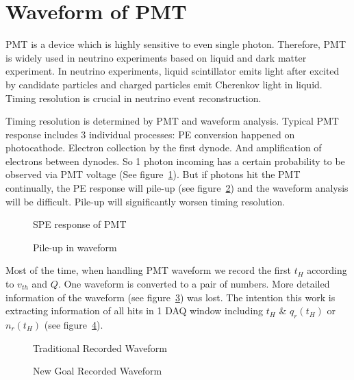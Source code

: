 \section{Waveform of PMT} %
PMT is a device which is highly sensitive to even single photon. Therefore, PMT is widely used in neutrino experiments based on liquid and dark matter experiment. In neutrino experiments, liquid scintillator emits light after excited by candidate particles and charged particles emit Cherenkov light in liquid. Timing resolution is crucial in neutrino event reconstruction. 

Timing resolution is determined by PMT and waveform analysis. Typical PMT response includes 3 individual processes: PE conversion happened on photocathode. Electron collection by the first dynode. And amplification of electrons between dynodes. So 1 photon incoming has a certain probability to be observed via PMT voltage (See figure~\ref{fig:spe}). But if photons hit the PMT continually, the PE response will pile-up (see figure~\ref{fig:pile}) and the waveform analysis will be difficult. Pile-up will significantly worsen timing resolution. 

\begin{minipage}{.5\textwidth}
\begin{figure}[H]
    \centering
    \resizebox{\textwidth}{!}{}
    \caption{\label{fig:spe} SPE response of PMT}
\end{figure}
\end{minipage}
\begin{minipage}{.5\textwidth}
\begin{figure}[H]
    \centering
    \resizebox{\textwidth}{!}{}
    \caption{\label{fig:pile} Pile-up in waveform}
\end{figure}
\end{minipage}

Most of the time, when handling PMT waveform we record the first $t_{H}$ according to $v_{th}$ and $Q$. One waveform is converted to a pair of numbers. More detailed information of the waveform (see figure~\ref{fig:tradi}) was lost. The intention this work is extracting information of all hits in 1 DAQ window including $t_{H}$ \& $q_{r}(t_{H})$ or $n_{r}(t_{H})$ (see figure~\ref{fig:new}). 

\begin{minipage}{.5\textwidth}
\begin{figure}[H]
    \centering
    \resizebox{\textwidth}{!}{}
    \caption{\label{fig:tradi} Traditional Recorded Waveform}
\end{figure}
\end{minipage}
\begin{minipage}{.5\textwidth}
\begin{figure}[H]
    \centering
    \resizebox{\textwidth}{!}{}
    \caption{\label{fig:new} New Goal Recorded Waveform}
\end{figure}
\end{minipage}

